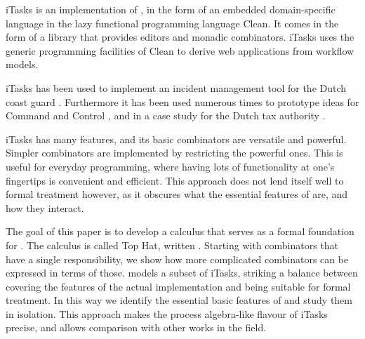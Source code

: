 iTasks is an implementation of \TOP, in the form of an embedded domain-specific language in the lazy functional programming language Clean.
It comes in the form of a library that provides editors and monadic combinators.
iTasks uses the generic programming facilities of Clean to derive web applications from workflow models.

iTasks has been used to implement an incident management tool for the Dutch coast guard \cite{conf/iscram/LijnseJP12}.
Furthermore it has been used numerous times to prototype ideas for Command and Control \cite{theses/nlda/Kool17, theses/radboud/Stutterheim17}, and in a case study for the Dutch tax authority \cite{conf/sfp/StutterheimAP17}.

iTasks has many features, and its basic combinators are versatile and powerful.
Simpler combinators are implemented by restricting the powerful ones.
This is useful for everyday programming, where having lots of functionality at one's fingertips is convenient and efficient.
This approach does not lend itself well to formal treatment however, as it obscures what the essential features of \TOP are, and how they interact.

The goal of this paper is to develop a calculus that serves as a formal foundation for \TOP.
The calculus is called Top Hat, written \TOPHAT.
Starting with combinators that have a single responsibility, we show how more complicated combinators can be expressed in terms of those.
\TOPHAT models a subset of iTasks, striking a balance between covering the features of the actual implementation and being suitable for formal treatment.
In this way we identify the essential basic features of \TOP and study them in isolation.
This approach makes the process algebra-like flavour of iTasks precise, and allows comparison with other works in the field.
